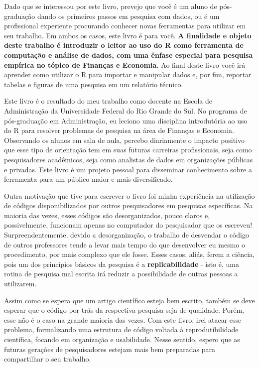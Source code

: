 \documentclass[
  11pt,
]{book}
\begin{document}
Dado que se interessou por este livro, prevejo que você é um aluno de pós-graduação dando os primeiros passos em pesquisa com dados, ou é um profissional experiente procurando conhecer novas ferramentas para utilizar em seu trabalho. Em ambos os casos, este livro é para você. \textbf{A finalidade e objeto deste trabalho é introduzir o leitor ao uso do R como ferramenta de computação e análise de dados, com uma ênfase especial para pesquisa empírica no tópico de Finanças e Economia.} Ao final deste livro você irá aprender como utilizar o R para importar e manipular dados e, por fim, reportar tabelas e figuras de uma pesquisa em um relatório técnico.

Este livro é o resultado do meu trabalho como docente na Escola de Administração da Universidade Federal do Rio Grande do Sul. No programa de pós-graduação em Administração, eu leciono uma disciplina introdutória ao uso do R para resolver problemas de pesquisa na área de Finanças e Economia. Observando os alunos em sala de aula, percebo diariamente o impacto positivo que esse tipo de orientação tem em suas futuras carreiras profissionais, seja como pesquisadores acadêmicos, seja como analistas de dados em organizações públicas e privadas. Este livro é um projeto pessoal para disseminar conhecimento sobre a ferramenta para um público maior e mais diversificado.

Outra motivação que tive para escrever o livro foi minha experiência na utilização de códigos disponibilizados por outros pesquisadores em pesquisas específicas. Na maioria das vezes, esses códigos são desorganizados, pouco claros e, possivelmente, funcionam apenas no computador do pesquisador que os escreveu! Surpreendentemente, devido a desorganização, o trabalho de desvendar o código de outros professores tende a levar mais tempo do que desenvolver eu mesmo o procedimento, por mais complexo que ele fosse. Esses casos, aliás, ferem a ciência, pois um dos princípios básicos da pesquisa é a \textbf{replicabilidade} - isto é, uma rotina de pesquisa mal escrita irá reduzir a possibilidade de outras pessoas a utilizarem.

Assim como se espera que um artigo científico esteja bem escrito, também se deve esperar que o código por trás da respectiva pesquisa seja de qualidade. Porém, esse não é o caso na grande maioria das vezes. Com este livro, irei atacar esse problema, formalizando uma estrutura de código voltada à reprodutibilidade científica, focando em organização e usabilidade. Nesse sentido, espero que as futuras gerações de pesquisadores estejam mais bem preparadas para compartilhar o seu trabalho.
\end{document}
